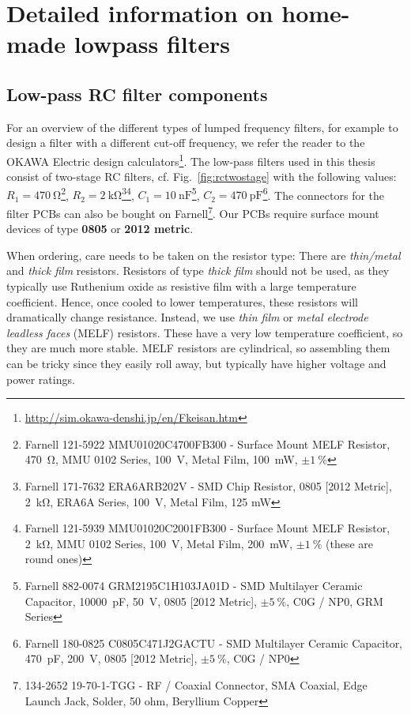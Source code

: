 \chapter{Detailed information on home-made lowpass filters}
\clearpage
\section{Low-pass RC filter components}\label{app:lowpassfilter}

For an overview of the different types of lumped frequency filters, for example to design a filter with a different cut-off frequency, we refer the reader to the OKAWA Electric design calculators\footnote{\url{http://sim.okawa-denshi.jp/en/Fkeisan.htm}}.
%
The low-pass filters used in this thesis consist of two-stage RC filters, cf. Fig.~\ref{fig:rctwostage} with the following values:
%
$R_1=\SI{470}{\ohm}$\footnote{Farnell 121-5922 MMU01020C4700FB300 - Surface Mount MELF Resistor, \SI{470}{\ohm}, MMU 0102 Series, \SI{100}{V}, Metal Film, \SI{100}{\milli\watt}, $\pm\SI{1}{\percent}$}, $R_2=\SI{2}{\kilo\ohm}$\footnote{Farnell 171-7632 ERA6ARB202V - SMD Chip Resistor, 0805 [2012 Metric], \SI{2}{\kilo\ohm}, ERA6A Series, \SI{100}{V}, Metal Film, 125 mW}\footnote{Farnell 121-5939 MMU01020C2001FB300 - Surface Mount MELF Resistor, \SI{2}{\kilo\ohm}, MMU 0102 Series, \SI{100}{V}, Metal Film, \SI{200}{\milli\watt}, $\pm\SI{1}{\percent}$ (these are round ones)}, $C_1=\SI{10}{\nano\farad}$\footnote{Farnell 882-0074 GRM2195C1H103JA01D - SMD Multilayer Ceramic Capacitor, \SI{10000}{\pico\farad}, \SI{50}{V}, 0805 [2012 Metric], $\pm\SI{5}{\percent}$, C0G / NP0, GRM Series}, $C_2=\SI{470}{\pico\farad}$\footnote{Farnell 180-0825 C0805C471J2GACTU - SMD Multilayer Ceramic Capacitor, \SI{470}{\pico\farad}, \SI{200}{V}, 0805 [2012 Metric], $\pm\SI{5}{\percent}$, C0G / NP0}.
%
The connectors for the filter PCBs can also be bought on Farnell\footnote{134-2652 19-70-1-TGG - RF / Coaxial Connector, SMA Coaxial, Edge Launch Jack, Solder, 50 ohm, Beryllium Copper}.
%
Our PCBs require surface mount devices of type \textbf{0805} or \textbf{2012 metric}.

When ordering, care needs to be taken on the resistor type:
%
There are \textit{thin/metal} and \textit{thick film} resistors.
%
Resistors of type \textit{thick film} should not be used, as they typically use Ruthenium oxide as resistive film with a large temperature coefficient.
%
Hence, once cooled to lower temperatures, these resistors will dramatically change resistance.
%
Instead, we use \textit{thin film} or \textit{metal electrode leadless faces} (MELF) resistors.
%
These have a very low temperature coefficient, so they are much more stable.
%
MELF resistors are cylindrical, so assembling them can be tricky since they easily roll away, but typically have higher voltage and power ratings.

